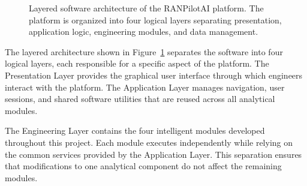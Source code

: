 \begin{figure}[H]

\caption{Layered software architecture of the RANPilotAI platform. The platform is organized into four logical layers separating presentation, application logic, engineering modules, and data management.}

\label{fig:software_architecture}

\end{figure}

The layered architecture shown in Figure~\ref{fig:software_architecture} separates the software into four logical layers, each responsible for a specific aspect of the platform. The Presentation Layer provides the graphical user interface through which engineers interact with the platform. The Application Layer manages navigation, user sessions, and shared software utilities that are reused across all analytical modules.

The Engineering Layer contains the four intelligent modules developed throughout this project. Each module executes independently while relying on the common services provided by the Application Layer. This separation ensures that modifications to one analytical component do not affect the remaining modules.

